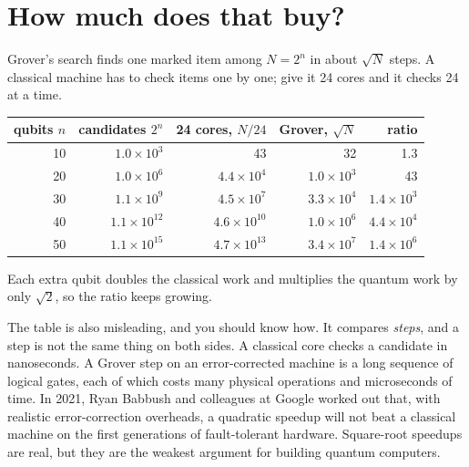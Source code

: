 \section{How much does that buy?}

Grover's search finds one marked item among $N = 2^n$ in about $\sqrt{N}$ steps.
A classical machine has to check items one by one; give it 24 cores and it checks
24 at a time.

\begin{center}
\begin{tabular}{rrrrr}
\hline
qubits $n$ & candidates $2^n$ & 24 cores, $N/24$ & Grover, $\sqrt{N}$ & ratio \\
\hline
10 & $1.0 \times 10^{3}$ & 43 & 32 & 1.3 \\
20 & $1.0 \times 10^{6}$ & $4.4 \times 10^{4}$ & $1.0 \times 10^{3}$ & 43 \\
30 & $1.1 \times 10^{9}$ & $4.5 \times 10^{7}$ & $3.3 \times 10^{4}$ & $1.4 \times 10^{3}$ \\
40 & $1.1 \times 10^{12}$ & $4.6 \times 10^{10}$ & $1.0 \times 10^{6}$ & $4.4 \times 10^{4}$ \\
50 & $1.1 \times 10^{15}$ & $4.7 \times 10^{13}$ & $3.4 \times 10^{7}$ & $1.4 \times 10^{6}$ \\
\hline
\end{tabular}
\end{center}

Each extra qubit doubles the classical work and multiplies the quantum work by
only $\sqrt{2}$, so the ratio keeps growing.

The table is also misleading, and you should know how. It compares
\emph{steps}, and a step is not the same thing on both sides. A classical core
checks a candidate in nanoseconds. A Grover step on an error-corrected machine is
a long sequence of logical gates, each of which costs many physical operations
and microseconds of time. In 2021, Ryan Babbush and colleagues at Google worked out
that, with realistic error-correction overheads, a quadratic speedup will not beat
a classical machine on the first generations of fault-tolerant hardware. Square-root
speedups are real, but they are the weakest argument for building quantum
computers.

